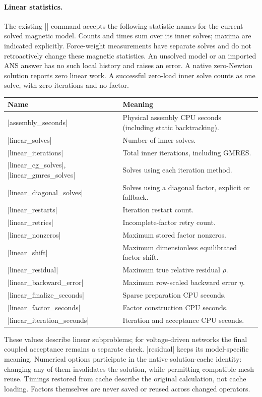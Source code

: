 \paragraph{Linear statistics.}
The existing |\femmstat| command accepts the following statistic names for the
current solved magnetic model. Counts and times sum over its
inner solves; maxima are indicated explicitly. Force-weight measurements have
separate solves and do not retroactively change these magnetic statistics.
An unsolved model or an imported ANS answer has no such local history and raises
an error. A native zero-Newton solution reports zero linear work. A successful
zero-load inner solve counts as one solve, with zero iterations and no factor.

\begin{center}\small
\begin{tabular}{lp{.49\linewidth}}
\toprule Name & Meaning \\
\midrule
|assembly_seconds| & Physical assembly CPU seconds (including static backtracking).\\
|linear_solves| & Number of inner solves.\\
|linear_iterations| & Total inner iterations, including GMRES.\\
|linear_cg_solves|, |linear_gmres_solves| & Solves using each iteration method.\\
|linear_diagonal_solves| & Solves using a diagonal factor, explicit or fallback.\\
|linear_restarts| & Iteration restart count.\\
|linear_retries| & Incomplete-factor retry count.\\
|linear_nonzeros| & Maximum stored factor nonzeros.\\
|linear_shift| & Maximum dimensionless equilibrated factor shift.\\
|linear_residual| & Maximum true relative residual $\rho$.\\
|linear_backward_error| & Maximum row-scaled backward error $\eta$.\\
|linear_finalize_seconds| & Sparse preparation CPU seconds.\\
|linear_factor_seconds| & Factor construction CPU seconds.\\
|linear_iteration_seconds| & Iteration and acceptance CPU seconds.\\
\bottomrule
\end{tabular}
\end{center}
These values describe linear subproblems; for voltage-driven networks the final
coupled acceptance remains a separate check. |residual| keeps its model-specific
meaning. Numerical options participate in the native solution-cache identity:
changing any of them invalidates the solution, while permitting compatible mesh
reuse. Timings restored from cache describe the original calculation, not cache
loading. Factors themselves are never saved or reused across changed operators.

